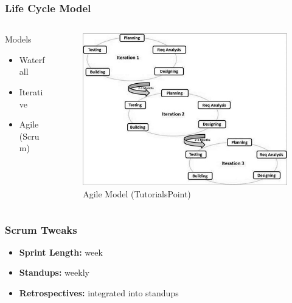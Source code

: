 \documentclass{beamer}
\begin{document}
\begin{frame}
    \frametitle{Life Cycle Model}
    \begin{columns}
        \begin{column}{0.5\textwidth}
            \begin{block}{Models}
                \begin{itemize}
                    \item Waterfall \pause
                    \item Iterative \pause
                    \item Agile (Scrum)
                \end{itemize}
            \end{block}
        \end{column}
        \begin{column}{0.5\textwidth}
            \begin{figure}
                \includegraphics[scale=0.34]{../02_dev_process/res/sdlc_agile_model.jpg}
                \caption{Agile Model (TutorialsPoint)}
            \end{figure}
        \end{column}
    \end{columns}
\end{frame}
 
\begin{frame}
    \frametitle{Scrum Tweaks} 
    \begin{itemize}
        \item \textbf{Sprint Length:}  week \pause
        \item \textbf{Standups:} \pause weekly \pause
        \item \textbf{Retrospectives:} \pause integrated into standups
    \end{itemize}
\end{frame}
\end{document}
